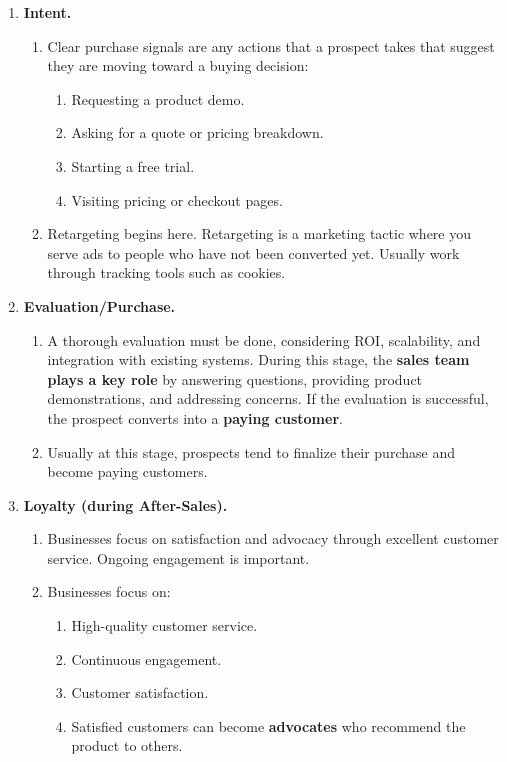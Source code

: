 \begin{enumerate}
    \item \textbf{Intent.}
    \begin{enumerate}
        \item Clear purchase signals are any actions that a prospect takes that suggest they are moving toward a buying decision:
        \begin{enumerate}
            \item Requesting a product demo.
            \item Asking for a quote or pricing breakdown.
            \item Starting a free trial.
            \item Visiting pricing or checkout pages.
        \end{enumerate}
        \item Retargeting begins here. Retargeting is a marketing tactic where you serve ads to people who have not been converted yet. Usually work through tracking tools such as cookies.
    \end{enumerate}

    \item \textbf{Evaluation/Purchase.}
    \begin{enumerate}
        \item A thorough evaluation must be done, considering ROI, scalability, and integration with existing systems. During this stage, the \textbf{sales team plays a key role} by answering questions, providing product demonstrations, and addressing concerns. If the evaluation is successful, the prospect converts into a \textbf{paying customer}.
        \item Usually at this stage, prospects tend to finalize their purchase and become paying customers.
    \end{enumerate}

    \item \textbf{Loyalty (during After-Sales).}
    \begin{enumerate}
        \item Businesses focus on satisfaction and advocacy through excellent customer service. Ongoing engagement is important.
        \item Businesses focus on:
        \begin{enumerate}
            \item High-quality customer service.
            \item Continuous engagement.
            \item Customer satisfaction.
            \item Satisfied customers can become \textbf{advocates} who recommend the product to others.
        \end{enumerate}
    \end{enumerate}

\end{enumerate}

